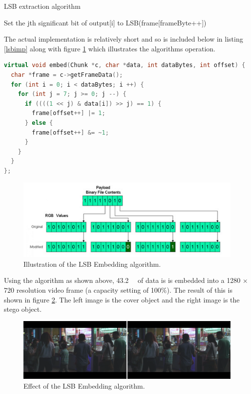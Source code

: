 \documentclass[paper=a4, fontsize=11pt,twoside]{scrartcl}
\numberwithin{table}{section}
\numberwithin{figure}{section}
\numberwithin{algorithm}{section}
\begin{document}
\begin{algorithm}[!htb]
\caption{LSB extraction algorithm}
\label{lsbext}
\begin{algorithmic}[1]
		\State Set the jth significant bit of output[i] to LSB(frame[frameByte++]) 
	\EndFor
\EndFor
\end{algorithmic}
\end{algorithm}

\noindent
The actual implementation is relatively short and so is included below in listing \ref{lsbimp} along with figure \ref{lsbill} which illustrates the algorithms operation.

\begin{lstlisting}[language=C++, caption={LSB implementation (\texttt{steg/lsb\_algorithm.cc:8})}, frame=single, label=lsbimp]
virtual void embed(Chunk *c, char *data, int dataBytes, int offset) {
  char *frame = c->getFrameData();
  for (int i = 0; i < dataBytes; i ++) {
    for (int j = 7; j >= 0; j --) {
      if ((((1 << j) & data[i]) >> j) == 1) {
        frame[offset++] |= 1;
      } else {
        frame[offset++] &= ~1;
      }
    }
  }
};
\end{lstlisting}

\begin{figure}[!htb]
\centerline{\includegraphics[width=\textwidth]{images/lsb_ill.png}}
\caption{Illustration of the LSB Embedding algorithm.}
\label{lsbill}
\end{figure}

\noindent
Using the algorithm as shown above, \SI{43.2}{\kilo\byte} of data is is embedded into a 1280 $\times$ 720 resolution video frame (a capacity setting of 100\%). The result of this is shown in figure \ref{lsbemb_full}. The left image is the cover object and the right image is the stego object. 

\begin{figure}[!h]
\centerline{\includegraphics[width=\textwidth]{images/lsb_emb_full.png}}
\caption{Effect of the LSB Embedding algorithm.}
\label{lsbemb_full}
\end{figure}
\end{document}
